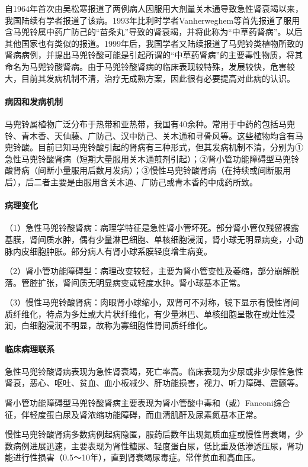 自1964年首次由吴松寒报道了两例病人因服用大剂量关木通导致急性肾衰竭以来，我国陆续有学者报道了该病。1993年比利时学者Vanherweghem等首先报道了服用含马兜铃属中药广防己的“苗条丸”导致的肾衰竭，并将此称为“中草药肾病”。以后其他国家也有类似的报道。1999年后，我国学者又陆续报道了马兜铃类植物所致的肾病病例，并提出马兜铃酸可能是引起所谓的“中草药肾病”的主要毒性物质，将其命名为马兜铃酸肾病。由于马兜铃酸肾病的临床表现较特殊，发展较快，危害较大，目前其发病机制不清，治疗无成熟方案，因此很有必要提高对此病的认识。

\paragraph{病因和发病机制}
马兜铃属植物广泛分布于热带和亚热带，我国有40余种。常用于中药的包括马兜铃、青木香、天仙藤、广防己、汉中防己、关木通和寻骨风等。这些植物均含有马兜铃酸。目前已知马兜铃酸引起的肾病有三种形式，但其发病机制不清，分别为①急性马兜铃酸肾病（短期大量服用关木通煎剂引起）；②肾小管功能障碍型马兜铃酸肾病（间断小量服用后数月发病）；③慢性马兜铃酸肾病（在持续或间断服用后），后二者主要是由服用含关木通、广防己或青木香的中成药所致。

\paragraph{病理变化}
（1）急性马兜铃酸肾病：病理学特征是急性肾小管坏死。部分肾小管仅残留裸露基膜，肾间质水肿，偶有少量淋巴细胞、单核细胞浸润，肾小球无明显病变，小动脉内皮细胞肿胀。部分病人有肾小球系膜轻度增生病变。

（2）肾小管功能障碍型：病理改变较轻，主要为肾小管变性及萎缩，部分崩解脱落。管腔扩张，肾间质无明显病变或轻度水肿。肾小球基本正常。

（3）慢性马兜铃酸肾病：肉眼肾小球缩小，双肾可不对称，镜下显示有慢性肾间质纤维化，特点为多灶或大片状纤维化，有少量淋巴、单核细胞呈散在或灶性浸润，白细胞浸润不明显，故称为寡细胞性肾间质纤维化。

\paragraph{临床病理联系}
急性马兜铃酸肾病表现为急性肾衰竭，死亡率高。临床表现为少尿或非少尿性急性肾衰，恶心、呕吐、贫血、血小板减少、肝功能损害，视力、听力障碍、震颤等。

肾小管功能障碍型马兜铃酸肾病主要表现为肾小管酸中毒和（或）Fanconi综合征，伴轻度蛋白尿及肾浓缩功能障碍，而血清肌酐及尿素氮基本正常。

慢性马兜铃酸肾病多数病例起病隐匿，服药后数年出现氮质血症或慢性肾衰竭，少数病例进展迅速，主要表现为肾性糖尿、轻度蛋白尿，低比重及低渗透压尿，肾功能进行性损害（0.5～10年），直到肾衰竭尿毒症。常伴贫血和高血压。

